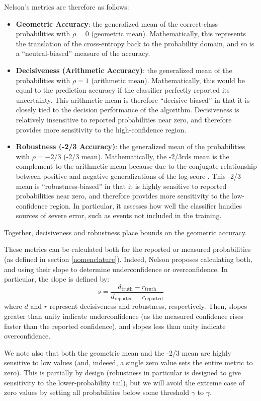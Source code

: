 \documentclass{spie}
\begin{document}
Nelson's metrics are therefore as follows:
\begin{itemize}
\item \textbf{Geometric Accuracy}: the generalized mean of the correct-class probabilities with $\rho = 0$ (geometric mean). Mathematically, this represents the translation of the cross-entropy back to the probability domain, and so is a ``neutral-biased'' measure of the accuracy. 
\item \textbf{Decisiveness (Arithmetic Accuracy)}: the generalized mean of the probabilities with $\rho = 1$ (arithmetic mean). Mathematically, this would be equal to the prediction accuracy if the classifier perfectly reported its uncertainty. This arithmetic mean is therefore ``decisive-biased'' in that it is closely tied to the decision performance of the algorithm. Decisiveness is relatively insensitive to reported probabilities near zero, and therefore provides more sensitivity to the high-confidence region. 
\item \textbf{Robustness (-2/3 Accuracy)}: the generalized mean of the probabilities with $\rho = -2/3$ (-2/3 mean). Mathematically, the -2/3rds mean is the complement to the arithmetic mean because due to the conjugate relationship between positive and negative generalizations of the log-score \cite{nelson2}. This -2/3 mean is ``robustness-biased'' in that it is highly sensitive to reported probabilities near zero, and therefore provides more sensitivity to the low-confidence region. In particular, it assesses how well the classifier handles sources of severe error, such as events not included in the training. 
\end{itemize}
Together, decisiveness and robustness place bounds on the geometric accuracy. 

These metrics can be calculated both for the reported or measured probabilities (as defined in section \ref{nomenclature}). Indeed, Nelson proposes calculating both, and using their slope to determine underconfidence or overconfidence. In particular, the slope is defined by:
\begin{equation} s = \frac{d_{\textrm{truth}} - r_{\textrm{truth}}}{d_{\textrm{reported}} - r_{\textrm{reported}}} \end{equation}
where $d$ and $r$ represent decisiveness and robustness, respectively. Then, slopes greater than unity indicate underconfidence (as the measured confidence rises faster than the reported confidence), and slopes less than unity indicate overconfidence. 

We note also that both the geometric mean and the -2/3 mean are highly sensitive to low values (and, indeeed, a single zero value sets the entire metric to zero). This is partially by design (robustness in particular is designed to give sensitivity to the lower-probability tail), but we will avoid the extreme case of zero values by setting all probabilities below some threshold $\gamma$ to $\gamma$.  
\end{document}

